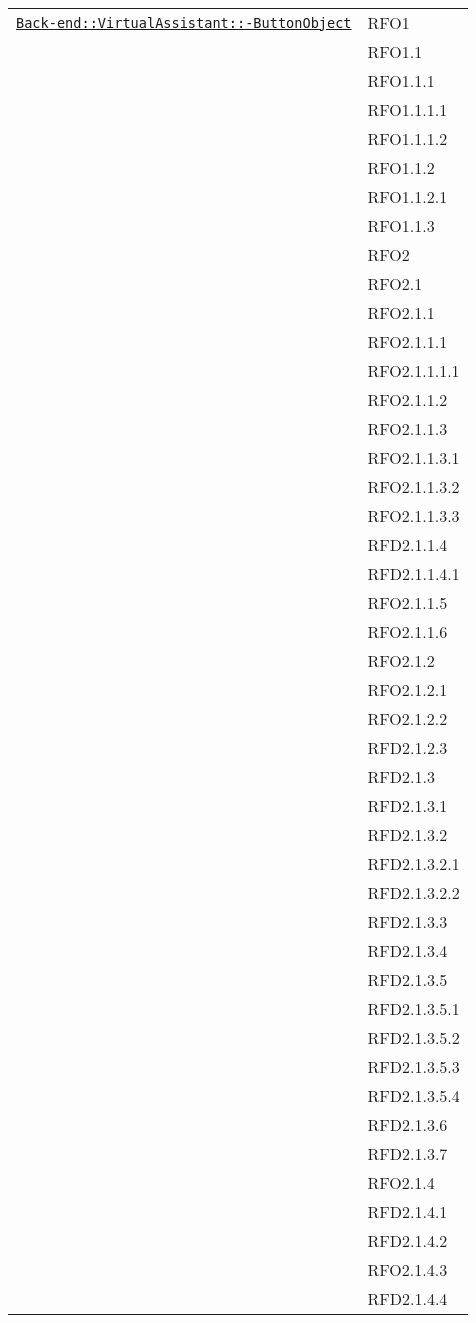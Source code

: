 \begin{longtable}{|>{\centering}m{10cm}|m{3cm}<{\centering}|}
\hyperref[Back-end::VirtualAssistant::ButtonObject]{\texttt{Back-end::VirtualAssistant::-\linebreak ButtonObject}} & RFO1\\
& RFO1.1\\
& RFO1.1.1\\
& RFO1.1.1.1\\
& RFO1.1.1.2\\
& RFO1.1.2\\
& RFO1.1.2.1\\
& RFO1.1.3\\
& RFO2\\
& RFO2.1\\
& RFO2.1.1\\
& RFO2.1.1.1\\
& RFO2.1.1.1.1\\
& RFO2.1.1.2\\
& RFO2.1.1.3\\
& RFO2.1.1.3.1\\
& RFO2.1.1.3.2\\
& RFO2.1.1.3.3\\
& RFD2.1.1.4\\
& RFD2.1.1.4.1\\
& RFO2.1.1.5\\
& RFO2.1.1.6\\
& RFO2.1.2\\
& RFO2.1.2.1\\
& RFO2.1.2.2\\
& RFD2.1.2.3\\
& RFD2.1.3\\
& RFD2.1.3.1\\
& RFD2.1.3.2\\
& RFD2.1.3.2.1\\
& RFD2.1.3.2.2\\
& RFD2.1.3.3\\
& RFD2.1.3.4\\
& RFD2.1.3.5\\
& RFD2.1.3.5.1\\
& RFD2.1.3.5.2\\
& RFD2.1.3.5.3\\
& RFD2.1.3.5.4\\
& RFD2.1.3.6\\
& RFD2.1.3.7\\
& RFO2.1.4\\
& RFD2.1.4.1\\
& RFD2.1.4.2\\
& RFO2.1.4.3\\
& RFD2.1.4.4\\

\end{longtable}
